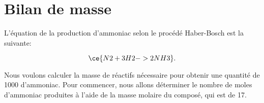%
%
%
%


\section{Bilan de masse}

L'équation de la production d'ammoniac selon le procédé Haber-Bosch est la suivante: 

\[
  \ce {N2 + 3H2 -> 2NH3}
  \text.
\]

Nous voulons calculer la masse de réactifs nécessaire pour obtenir une quantité de \unit{1000}{\tonne}  d'ammoniac. Pour commencer, nous allons déterminer le nombre de moles d'ammoniac produites à l'aide de la masse molaire du composé, qui est de \unit{17}{\gram\per\mole}.

